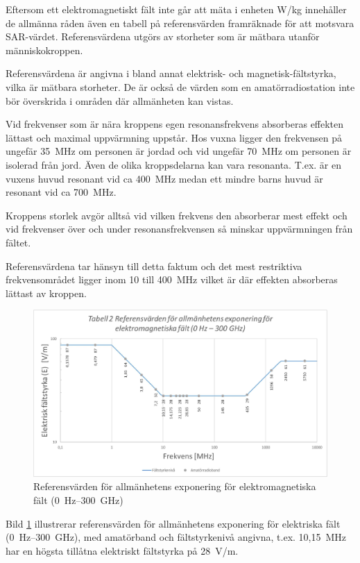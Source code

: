 Eftersom ett elektromagnetiskt fält inte går att mäta i enheten W/kg
innehåller de allmänna råden även en tabell på referensvärden
framräknade för att motsvara SAR-värdet. Referensvärdena utgörs av
storheter som är mätbara utanför människokroppen.

Referensvärdena är angivna i bland annat elektrisk- och
magnetisk-fältstyrka, vilka är mätbara storheter. De är också de
värden som en amatörradiostation inte bör överskrida i områden där
allmänheten kan vistas.

Vid frekvenser som är nära kroppens egen resonansfrekvens absorberas
effekten lättast och maximal uppvärmning uppstår. Hos vuxna ligger
den frekvensen på ungefär 35~MHz om personen är jordad och vid
ungefär 70~MHz om personen är isolerad från jord. Även de olika
kroppsdelarna kan vara resonanta. T.ex. är en vuxens huvud resonant
vid ca 400~MHz medan ett mindre barns huvud är resonant vid ca 700~MHz.

Kroppens storlek avgör alltså vid vilken frekvens den absorberar mest
effekt och vid frekvenser över och under resonansfrekvensen så minskar
uppvärmningen från fältet.

Referensvärdena tar hänsyn till detta faktum och det mest restriktiva
frekvensområdet ligger inom 10 till 400~MHz vilket är där effekten
absorberas lättast av kroppen.

\begin{figure}[h]
\begin{center}
\includegraphics[width=14cm]{images/emfbild-000}
\caption{Referensvärden för allmänhetens exponering för elektromagnetiska fält (0~Hz--300~GHz)}
\label{fig:emf1}
\end{center}
\end{figure}

Bild \ref{fig:emf1} illustrerar referensvärden för allmänhetens
exponering för elektriska fält (0~Hz--300~GHz), med amatörband
och fältstyrkenivå angivna, t.ex. 10,15~MHz har en högsta tillåtna
elektriskt fältstyrka på 28~V/m.

